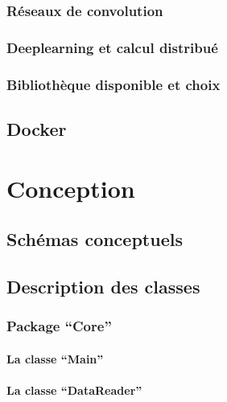 \documentclass[a4paper,10pt,openany,oneside]{sphinxmanual}
\begin{document}
\subsection{Réseaux de convolution}
\label{index:reseaux-de-convolution}

\subsection{Deeplearning et calcul distribué}
\label{index:deeplearning-et-calcul-distribue}

\subsection{Bibliothèque disponible et choix}
\label{index:bibliotheque-disponible-et-choix}

\section{Docker}
\label{index:docker}

\chapter{Conception}
\label{index:conception}

\section{Schémas conceptuels}
\label{index:schemas-conceptuels}

\section{Description des classes}
\label{index:description-des-classes}

\subsection{Package ``Core''}
\label{index:package-core}

\subsubsection{La classe ``Main''}
\label{index:la-classe-main}

\subsubsection{La classe ``DataReader''}
\label{index:la-classe-datareader}
\end{document}
